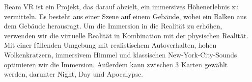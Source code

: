 Beam VR ist ein Projekt, das darauf abzielt, ein immersives Höhenerlebnis zu vermitteln.
Es besteht aus einer Szene auf einem Gebäude, wobei ein Balken aus dem Gebäude herausragt.
Um die Immersion in die Realität zu erhöhen, verwenden wir die virtuelle Realität in Kombination mit der physischen Realität.
Mit einer füllenden Umgebung mit realistischem Autoverhalten, hohen Wolkenkratzern, immersivem Himmel und klassischen New-York-City-Sounds optimieren wir die Immersion.
Außerdem kann zwischen 3 Karten gewählt werden, darunter Night, Day und Apocalypse.
